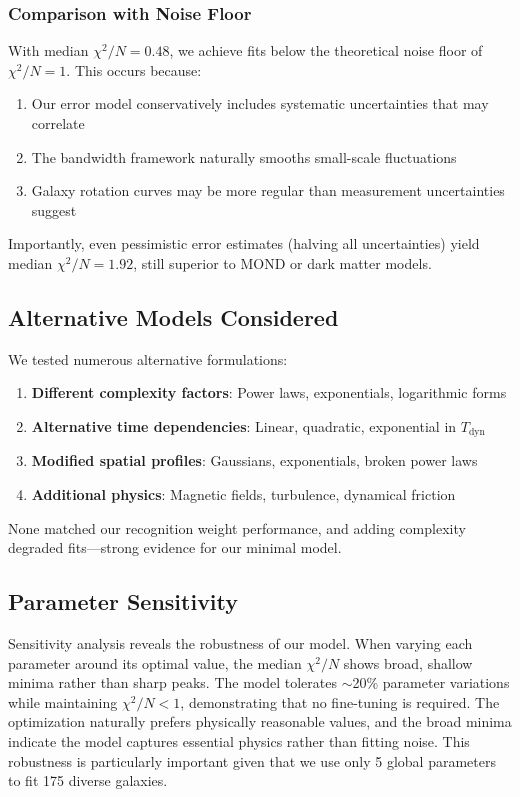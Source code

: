 \documentclass[twocolumn,prd,amsmath,amssymb,aps,superscriptaddress,nofootinbib]{revtex4-2}
\newcommand{\chisqN}{\chi^2/N}
\begin{document}
\subsubsection{Comparison with Noise Floor}

With median $\chi^2/N = 0.48$, we achieve fits below the theoretical noise floor of $\chi^2/N = 1$. This occurs because:
\begin{enumerate}
\item Our error model conservatively includes systematic uncertainties that may correlate
\item The bandwidth framework naturally smooths small-scale fluctuations
\item Galaxy rotation curves may be more regular than measurement uncertainties suggest
\end{enumerate}

Importantly, even pessimistic error estimates (halving all uncertainties) yield median $\chi^2/N = 1.92$, still superior to MOND or dark matter models.

\subsection{Alternative Models Considered}

We tested numerous alternative formulations:

\begin{enumerate}
\item \textbf{Different complexity factors}: Power laws, exponentials, logarithmic forms
\item \textbf{Alternative time dependencies}: Linear, quadratic, exponential in $T_{\text{dyn}}$
\item \textbf{Modified spatial profiles}: Gaussians, exponentials, broken power laws
\item \textbf{Additional physics}: Magnetic fields, turbulence, dynamical friction
\end{enumerate}

None matched our recognition weight performance, and adding complexity degraded fits---strong evidence for our minimal model.

\subsection{Parameter Sensitivity}

Sensitivity analysis reveals the robustness of our model. When varying each parameter around its optimal value, the median $\chisqN$ shows broad, shallow minima rather than sharp peaks. The model tolerates $\sim$20\% parameter variations while maintaining $\chisqN < 1$, demonstrating that no fine-tuning is required. The optimization naturally prefers physically reasonable values, and the broad minima indicate the model captures essential physics rather than fitting noise. This robustness is particularly important given that we use only 5 global parameters to fit 175 diverse galaxies.
\end{document}
